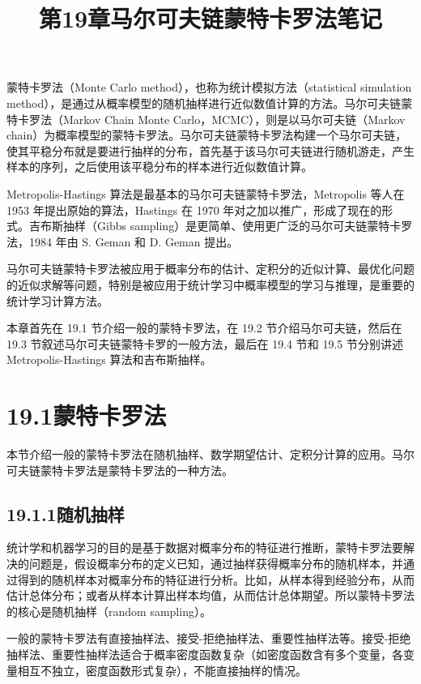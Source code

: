 \documentclass[UTF8,12pt,a4paper,fontset=fandol]{ctexart}
\title{第19章\quad 马尔可夫链蒙特卡罗法笔记}
\author{}
\date{}
\begin{document}
\maketitle

蒙特卡罗法（Monte Carlo method），也称为统计模拟方法（statistical simulation method），是通过从概率模型的随机抽样进行近似数值计算的方法。马尔可夫链蒙特卡罗法（Markov Chain Monte Carlo，MCMC），则是以马尔可夫链（Markov chain）为概率模型的蒙特卡罗法。马尔可夫链蒙特卡罗法构建一个马尔可夫链，使其平稳分布就是要进行抽样的分布，首先基于该马尔可夫链进行随机游走，产生样本的序列，之后使用该平稳分布的样本进行近似数值计算。

Metropolis-Hastings 算法是最基本的马尔可夫链蒙特卡罗法，Metropolis 等人在 1953 年提出原始的算法，Hastings 在 1970 年对之加以推广，形成了现在的形式。吉布斯抽样（Gibbs sampling）是更简单、使用更广泛的马尔可夫链蒙特卡罗法，1984 年由 S. Geman 和 D. Geman 提出。

马尔可夫链蒙特卡罗法被应用于概率分布的估计、定积分的近似计算、最优化问题的近似求解等问题，特别是被应用于统计学习中概率模型的学习与推理，是重要的统计学习计算方法。

本章首先在 19.1 节介绍一般的蒙特卡罗法，在 19.2 节介绍马尔可夫链，然后在 19.3 节叙述马尔可夫链蒙特卡罗的一般方法，最后在 19.4 节和 19.5 节分别讲述 Metropolis-Hastings 算法和吉布斯抽样。

\section*{19.1\quad 蒙特卡罗法}

本节介绍一般的蒙特卡罗法在随机抽样、数学期望估计、定积分计算的应用。马尔可夫链蒙特卡罗法是蒙特卡罗法的一种方法。

\subsection*{19.1.1\quad 随机抽样}

统计学和机器学习的目的是基于数据对概率分布的特征进行推断，蒙特卡罗法要解决的问题是，假设概率分布的定义已知，通过抽样获得概率分布的随机样本，并通过得到的随机样本对概率分布的特征进行分析。比如，从样本得到经验分布，从而估计总体分布；或者从样本计算出样本均值，从而估计总体期望。所以蒙特卡罗法的核心是随机抽样（random sampling）。

一般的蒙特卡罗法有直接抽样法、接受-拒绝抽样法、重要性抽样法等。接受-拒绝抽样法、重要性抽样法适合于概率密度函数复杂（如密度函数含有多个变量，各变量相互不独立，密度函数形式复杂），不能直接抽样的情况。
\end{document}
